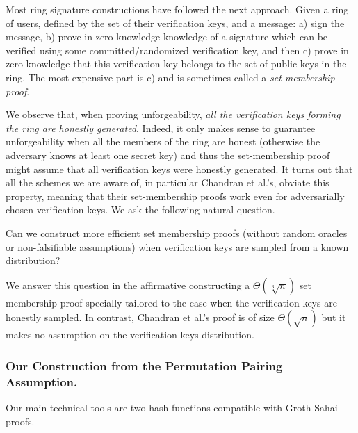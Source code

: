 
Most ring signature constructions have followed the next approach. Given a ring of users, defined by the set of their verification keys, and a message: a) sign the message, b) prove in zero-knowledge knowledge of a signature which can be verified using some committed/randomized verification key, and then c) prove in zero-knowledge that this verification key belongs to the set of public keys in the ring.  The most expensive part is c) and is sometimes called a \emph{set-membership proof}.

We observe that, when proving unforgeability, \emph{all the verification keys forming the ring are honestly generated}. 
Indeed, it only makes sense to guarantee unforgeability when all the members of the ring are honest (otherwise the adversary knows at least one secret key) and thus the set-membership proof might assume that all verification keys were honestly generated.
It turns out that all the schemes we are aware of, in particular Chandran et al.'s, obviate this property, meaning that their set-membership proofs work even for adversarially chosen verification keys.
We ask the following natural question.
\begin{displayquote}
Can we construct more efficient set membership proofs (without random oracles or non-falsifiable assumptions) when verification keys are sampled from a known distribution?
\end{displayquote}
We answer this question in the affirmative constructing a $\Theta(\sqrt[3]{n})$ set membership proof specially tailored to the case when the verification keys are honestly sampled. In contrast, Chandran et al.'s proof is of size $\Theta(\sqrt{n})$ but it makes no assumption on the verification keys distribution.

\subsubsection{Our Construction from the Permutation Pairing Assumption.}
Our main technical tools are two hash functions compatible with Groth-Sahai proofs.

